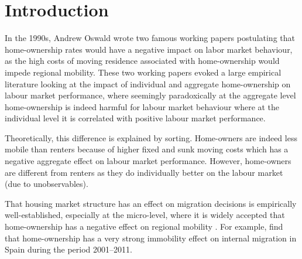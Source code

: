 \documentclass[fleqn,10pt]{SelfArx} %
\affiliation{\textsuperscript{1}\textit{Department of Spatial Economics, Vrije Universiteit Amsterdam, Amsterdam, The Netherlands}} %
\affiliation{*\textbf{Corresponding author}: \Letter{} t.de.graaff@vu.n; \Mundus{} \href{thomasdegraaff.nl}{thomasdegraaff.nl}} %
\begin{document}
	
	\flushbottom %
	\maketitle %
	\thispagestyle{empty} %
	
	
	\section{Introduction} %

        In the 1990s, Andrew Oswald wrote two famous working papers
        \citep{oswald1996conjecture, oswald1999housing} postulating
        that home-ownership rates would have a negative impact on labor
        market behaviour, as the high costs of moving residence
        associated with home-ownership would impede regional
        mobility. These two working papers evoked a large empirical
        literature \citep[see, e.g., ][]{munch2006homeowners,
          munch2008home, de2013european} looking at the impact of
        individual and aggregate home-ownership on labour market
        performance, where seemingly paradoxically at the aggregate
        level home-ownership is indeed harmful for labour market
        behaviour where at the individual level it is correlated with
        positive labour market performance.
        
        Theoretically, this difference is explained by
        sorting. Home-owners are indeed less mobile than renters
        because of higher fixed and sunk moving costs which has a
        negative aggregate effect on labour market
        performance. However, home-owners are different from renters
        as they do individually better on the labour market (due to
        unobservables).

        That housing market structure has an effect on migration
        decisions is empirically well-established, especially at the micro-level,
        where it is widely accepted that home-ownership has a negative
        effect on regional mobility \citep{dietz2003social}. For
        example, \citet{palomares2018understanding} find that
        home-ownership has a very strong immobility effect on
        internal migration in Spain during the period 2001--2011.
\end{document}
